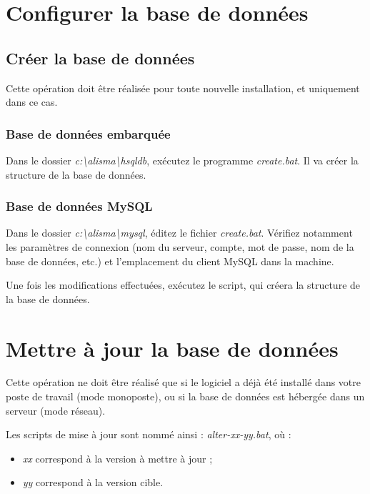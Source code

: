 \section{Configurer la base de données}

\subsection{Créer la base de données}

Cette opération doit être réalisée pour toute nouvelle installation, et uniquement dans ce cas.

\subsubsection{Base de données embarquée}

Dans le dossier \textit{\NoAutoSpaceBeforeFDP c:\textbackslash{}alisma\textbackslash{}hsqldb}, exécutez le programme \textit{create.bat}. Il va créer la structure de la base de données.

\subsubsection{Base de données MySQL}

Dans le dossier \textit{\NoAutoSpaceBeforeFDP c:\textbackslash{}alisma\textbackslash{}mysql}, éditez le fichier \textit{create.bat}. Vérifiez notamment les paramètres de connexion (nom du serveur, compte, mot de passe, nom de la base de données, etc.) et l'emplacement du client MySQL dans la machine.

Une fois les modifications effectuées, exécutez le script, qui créera la structure de la base de données.

\section{Mettre à jour la base de données}

Cette opération ne doit être réalisé que si le logiciel a déjà été installé dans votre poste de travail (mode monoposte), ou si la base de données est hébergée dans un serveur (mode réseau).

Les scripts de mise à jour sont nommé ainsi : \textit{alter-xx-yy.bat}, où :
\begin{itemize}
\item \textit{xx} correspond à la version à mettre à jour ;
\item \textit{yy} correspond à la version cible.
\end{itemize}


